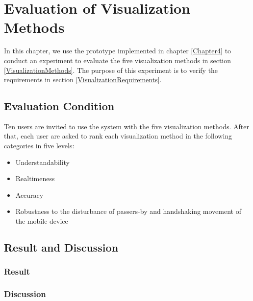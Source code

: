 \chapter{Evaluation of Visualization Methods}
\label{Chapter5}

In this chapter, we use the prototype implemented in chapter \ref{Chapter4} to conduct an experiment to evaluate the five visualization methods in section \ref{VisualizationMethods}. The purpose of this experiment is to verify the requirements in section \ref{VisualizationRequirements}.

\section{Evaluation Condition}

Ten users are invited to use the system with the five visualization methods. After that, each user are asked to rank each visualization method in the following categories in five levels:

\begin{itemize}
	\item Understandability
	\item Realtimeness
	\item Accuracy
	\item Robustness to the disturbance of passers-by and handshaking movement of the mobile device
\end{itemize}

\section{Result and Discussion}

\subsection{Result}

\subsection{Discussion}

